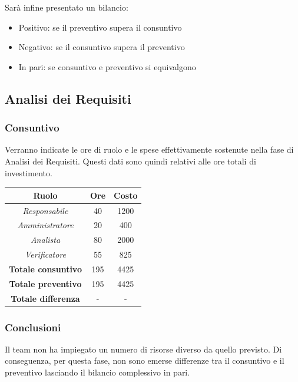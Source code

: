 Sarà infine presentato un bilancio:
\begin{itemize}
\item Positivo: se il preventivo supera il consuntivo
\item Negativo: se il consuntivo supera il preventivo
\item In pari: se consuntivo e preventivo si equivalgono
\end{itemize}

\subsection{Analisi dei Requisiti}

\subsubsection{Consuntivo}

Verranno indicate le ore di ruolo e le spese effettivamente sostenute nella fase di Analisi dei Requisiti. Questi dati sono quindi relativi alle ore totali di investimento.

\begin{center}
  \centering
  \begin{tabular}{|c|c|c|}
    \hline
    \textbf{Ruolo} & \textbf{Ore} & \textbf{Costo} \\
    \hline
     \emph{Responsabile}  & 40 & 1200 \\
    \hline  \emph{Amministratore}  & 20 & 400 \\
    \hline  \emph{Analista}  & 80 & 2000 \\
    \hline  \emph{Verificatore}  & 55 & 825 \\
    \hline
    \textbf{Totale consuntivo} & 195 & 4425 \\
    \hline
    \textbf{Totale preventivo} & 195 & 4425 \\
    \hline
    \textbf{Totale differenza} & - & - \\
    \hline
  \end{tabular}

\end{center}

\subsubsection{Conclusioni}

Il team non ha impiegato un numero di risorse diverso da quello previsto. Di conseguenza, per questa fase, non sono emerse differenze tra il consuntivo e il preventivo lasciando il bilancio complessivo in pari.


